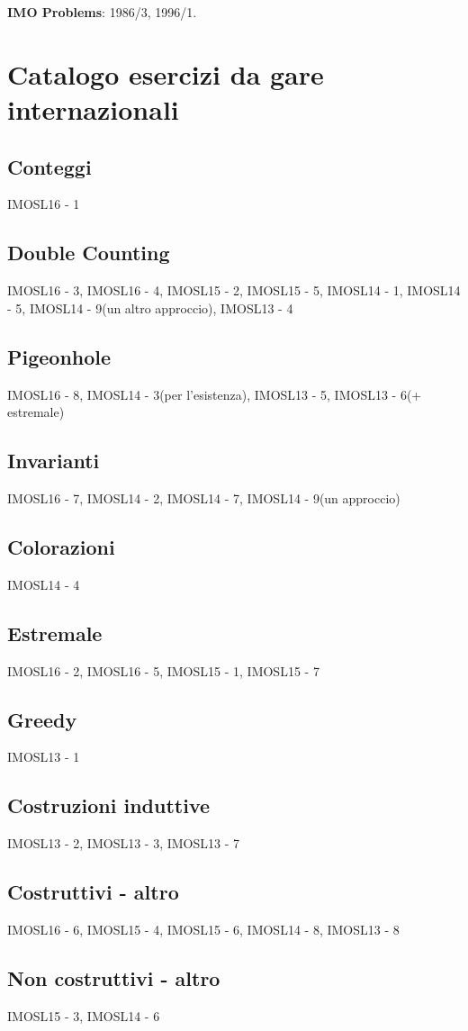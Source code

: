 \documentclass[a4paper,10pt]{article}
\newcommand{\Pro}[3]{#1#2 - #3}
\begin{document}
\textbf{IMO Problems}: 1986/3, 1996/1.


\section{Catalogo esercizi da gare internazionali}

\subsection{Conteggi}
\Pro{IMOSL}{16}{1}

\subsection{Double Counting}
\Pro{IMOSL}{16}{3}, \Pro{IMOSL}{16}{4}, \Pro{IMOSL}{15}{2}, \Pro{IMOSL}{15}{5}, \Pro{IMOSL}{14}{1}, \Pro{IMOSL}{14}{5}, \Pro{IMOSL}{14}{9}(un altro approccio), \Pro{IMOSL}{13}{4}

\subsection{Pigeonhole}
\Pro{IMOSL}{16}{8}, \Pro{IMOSL}{14}{3}(per l'esistenza), \Pro{IMOSL}{13}{5}, \Pro{IMOSL}{13}{6}(+ estremale)

\subsection{Invarianti}
\Pro{IMOSL}{16}{7}, \Pro{IMOSL}{14}{2}, \Pro{IMOSL}{14}{7}, \Pro{IMOSL}{14}{9}(un approccio)

\subsection{Colorazioni}
\Pro{IMOSL}{14}{4}

\subsection{Estremale}
\Pro{IMOSL}{16}{2}, \Pro{IMOSL}{16}{5}, \Pro{IMOSL}{15}{1}, \Pro{IMOSL}{15}{7}

\subsection{Greedy}
\Pro{IMOSL}{13}{1}

\subsection{Costruzioni induttive}
\Pro{IMOSL}{13}{2}, \Pro{IMOSL}{13}{3}, \Pro{IMOSL}{13}{7}

\subsection{Costruttivi - altro}
\Pro{IMOSL}{16}{6}, \Pro{IMOSL}{15}{4}, \Pro{IMOSL}{15}{6}, \Pro{IMOSL}{14}{8}, \Pro{IMOSL}{13}{8}

\subsection{Non costruttivi - altro}
\Pro{IMOSL}{15}{3}, \Pro{IMOSL}{14}{6}
\end{document}
